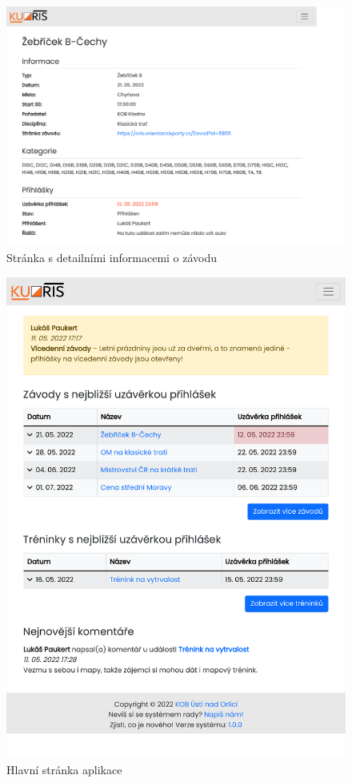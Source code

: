 \begin{figure}[h]
    \caption{Stránka s detailními informacemi o závodu}
    \centering
    \includegraphics[width=0.995\linewidth, cfbox=kuorisgray 0.5pt 0pt]{images/appendix-detail.pdf}
\end{figure}

\begin{figure}[ht!]
    \caption{Hlavní stránka aplikace}
    \centering
    \includegraphics[width=0.995\linewidth, trim={0 1pt 0 0}, cfbox=kuorisgray 0.5pt 0pt]{images/appendix-homepage.pdf}
    \vspace{12.2mm}
\end{figure}
